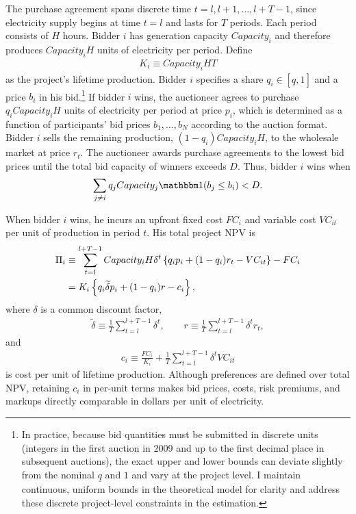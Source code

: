 \documentclass[10pt]{article}
\newcommand{\I}{\mathbbm1}
\theoremstyle{plain}
\theoremstyle{definition}
\begin{document}
The purchase agreement spans discrete time
$t=l,l+1,\dots,l+T-1$, since electricity supply begins at time $t=l$ and
lasts for $T$ periods. Each period consists of $H$ hours. Bidder $i$ has
generation capacity $Capacity_i$ and therefore produces
$Capacity_iH$ units of electricity per period. Define
\begin{align*}
K_i\equiv Capacity_iHT
\end{align*}
as the project's lifetime production. Bidder $i$ specifies a share
$q_i\in[\underline{q},1]$ and a price $b_i$ in his bid.\footnote{
In practice, because bid quantities must be submitted in discrete units
(integers in the first auction in 2009 and up to the first decimal place in
subsequent auctions), the exact upper and lower bounds can deviate slightly
from the nominal $\underline{q}$ and $1$ and vary at the project level. I
maintain continuous, uniform bounds in the theoretical model for clarity and
address these discrete project-level constraints in the estimation.
} If bidder $i$ wins, the auctioneer agrees to purchase
$q_iCapacity_iH$ units of electricity per period at price $p_i$, which is
determined as a function of participants' bid prices
$b_1,\dots,b_N$ according to the auction format. Bidder $i$ sells the
remaining production, $(1-q_i)Capacity_iH$, to the wholesale market at price
$r_t$. The auctioneer awards purchase agreements to the lowest bid prices
until the total bid capacity of winners exceeds $D$. Thus, bidder $i$ wins
when
\begin{align*}
\sum_{j\neq i}q_jCapacity_j\I(b_j\leq b_i)<D.
\end{align*}

When bidder $i$ wins, he incurs an upfront fixed cost $FC_i$ and variable cost
$VC_{it}$ per unit of production in period $t$. His total project NPV is
\begin{align}
\label{eq:totalnpv}
\Pi_i
&\equiv
\sum_{t=l}^{l+T-1}Capacity_iH\delta^t
\left\{q_ip_i+(1-q_i)r_t-VC_{it}\right\}-FC_i \notag\\
&=K_i\left\{q_i\widetilde{\delta}p_i+(1-q_i)r-c_i\right\},
\end{align}
where $\delta$ is a common discount factor,
\begin{align*}
\widetilde{\delta}
\equiv \frac{1}{T}\sum_{t=l}^{l+T-1}\delta^t,
\qquad
r\equiv \frac{1}{T}\sum_{t=l}^{l+T-1}\delta^tr_t,
\end{align*}
and
\begin{align*}
c_i\equiv
\frac{FC_i}{K_i}
+\frac{1}{T}\sum_{t=l}^{l+T-1}\delta^tVC_{it}
\end{align*}
is cost per unit of lifetime production. Although preferences are defined over
total NPV, retaining $c_i$ in per-unit terms makes bid prices, costs, risk
premiums, and markups directly comparable in dollars per unit of electricity.
\end{document}
